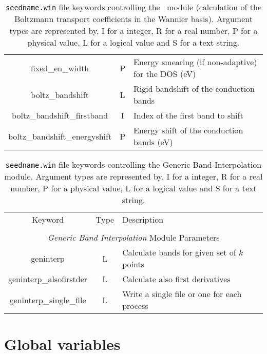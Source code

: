 \begin{table}[hH!]
\begin{center}
\begin{tabular}{|c|c|p{6cm}|}
{fixed\_en\_width} & P  & Energy smearing (if non-adaptive) for the DOS (eV) \\
{\sc boltz\_bandshift} & L & Rigid bandshift of the conduction bands\\
{\sc boltz\_bandshift\_firstband} & I & Index of the first band to shift\\
{\sc boltz\_bandshift\_energyshift} & P & Energy shift of the conduction bands (eV)\\
\hline
\end{tabular}
\caption[Parameter file keywords controlling the \bw\ module.]
{{\tt seedname.win} file keywords controlling the \bw\ module (calculation of the Boltzmann transport coefficients in the Wannier basis). Argument types
are represented by, I for a integer, R for a real number, P for a
physical value, L for a logical value and S for a text string.}
\label{parameter_keywords_bw}
\end{center}
\end{table}

\begin{table}[hH!]
\begin{center}
\begin{tabular}{|c|c|p{6cm}|}
\hline
Keyword & Type & Description \\
        &      &             \\
\hline\hline
\multicolumn{3}{|c|}{\emph{Generic Band Interpolation} Module Parameters} \\
\hline
{\sc geninterp}   & L & Calculate bands for given set of $k$ points \\
{\sc geninterp\_alsofirstder} & L & Calculate also first derivatives\\ 
{\sc geninterp\_single\_file} & L & Write a single file or one for each
process\\ 
\hline
\end{tabular}
\caption[Parameter file keywords controlling the Generic Band Interpolation module.]
{{\tt seedname.win} file keywords controlling the Generic Band Interpolation module. Argument types
are represented by, I for a integer, R for a real number, P for a
physical value, L for a logical value and S for a text string.}
\label{parameter_keywords_geninterp}
\end{center}
\end{table}

\clearpage
\section{Global variables}
\label{sec:postw90-globalflags}

